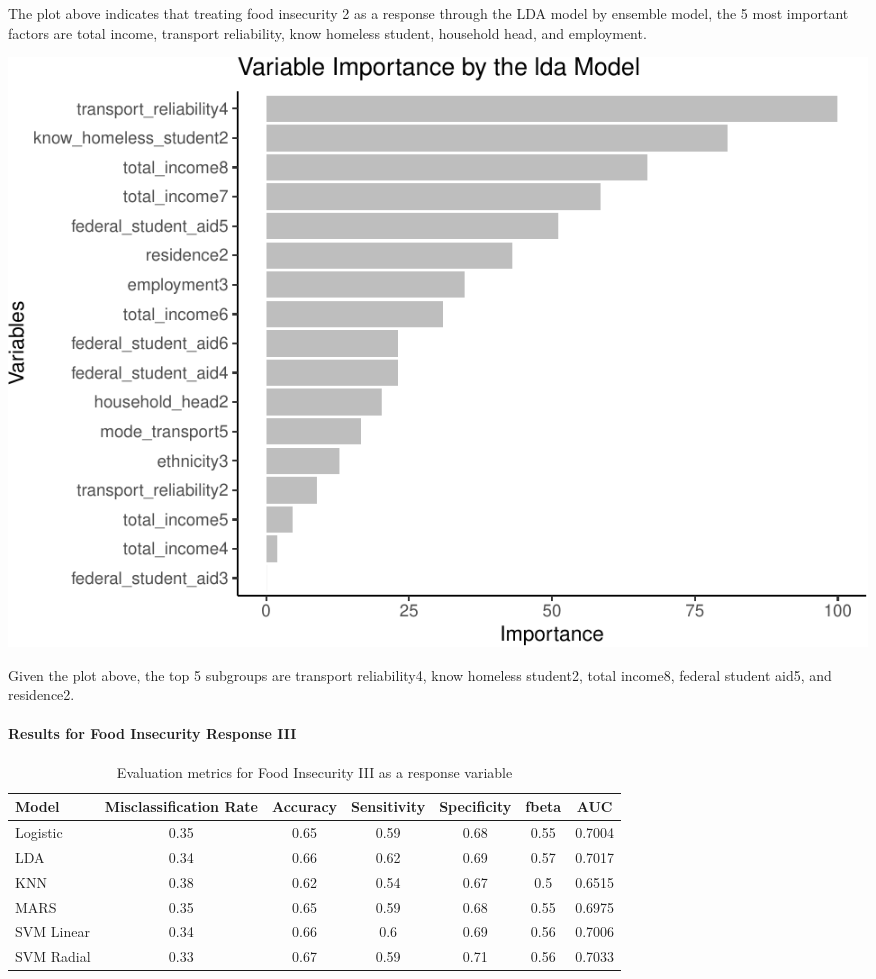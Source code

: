 \documentclass[
  10pt,
]{article}
\begin{document}
The plot above indicates that treating food insecurity 2 as a response through the LDA model by ensemble model, the 5 most important factors are total income, transport reliability, know homeless student, household head, and employment.\\

\begin{center}\includegraphics{phase2_report_files/figure-latex/unnamed-chunk-24-1} \end{center}

Given the plot above, the top 5 subgroups are transport reliability4, know homeless student2, total income8, federal student aid5, and residence2.\\

\hypertarget{results-for-food-insecurity-response-iii}{%
\paragraph{Results for Food Insecurity Response III}\label{results-for-food-insecurity-response-iii}}

\begin{table}[H]

\caption{\label{tab:unnamed-chunk-25}Evaluation metrics for Food Insecurity III  as a response variable}
\centering
\fontsize{12}{14}\selectfont
\begin{tabular}[t]{lcccccc}
\toprule
Model & Misclassification Rate & Accuracy & Sensitivity & Specificity & fbeta & AUC\\
\midrule
Logistic & 0.35 & 0.65 & 0.59 & 0.68 & 0.55 & 0.7004\\
LDA & 0.34 & 0.66 & 0.62 & 0.69 & 0.57 & 0.7017\\
KNN & 0.38 & 0.62 & 0.54 & 0.67 & 0.5 & 0.6515\\
MARS & 0.35 & 0.65 & 0.59 & 0.68 & 0.55 & 0.6975\\
SVM Linear & 0.34 & 0.66 & 0.6 & 0.69 & 0.56 & 0.7006\\
SVM Radial & 0.33 & 0.67 & 0.59 & 0.71 & 0.56 & 0.7033\\
\bottomrule
\end{tabular}
\end{table}
\end{document}
